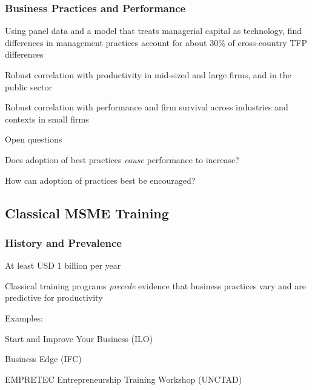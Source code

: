 \documentclass[hideothersubsections, usenames,dvipsnames,11pt]{beamer}
\newenvironment{itemize_2pt}{\itemize\addtolength{\itemsep}{2pt}}{\enditemize}
\begin{document}
\begin{frame}
\frametitle{Business Practices and Performance}

	Using panel data and a model that treats managerial capital as technology, \citet{Bloom2016} find differences in management practices account for about 30\% of cross-country TFP differences
	\begin{itemize_2pt}
		\item Robust correlation with productivity in \textcolor{bdf}{mid-sized and large firms}, and in the \textcolor{bdf}{public sector} \citep{Bloom2015,Bloom2020} %
		\item Robust correlation with performance and firm survival across industries and contexts in \textcolor{bdf}{small firms} \citep{McKenzie2017}
		\end{itemize_2pt}
		
\vspace{0.1in}	
	
	Open questions
	\begin{itemize_2pt}
		\item Does adoption of best practices \emph{cause} performance to increase?
		\item How can adoption of practices best be encouraged?
	\end{itemize_2pt}	
	
\end{frame}


\subsection{Classical MSME Training}

\begin{frame}
\frametitle{History and Prevalence}
	\begin{itemize_2pt}
		\item At least \textcolor{bdf}{USD 1 billion per year} \citep[for $\sim$ 4-5 million entrepreneurs;][]{McKenzie2021}
		\item Classical training programs \emph{precede} evidence that business practices vary and are predictive for productivity
		
		\vspace{0.5em}		
		
		\item Examples:
		\begin{itemize_2pt}
			\item Start and Improve Your Business (ILO)
			\item Business Edge (IFC)
			\item EMPRETEC Entrepreneurship Training Workshop (UNCTAD)
		\end{itemize_2pt} 
	\end{itemize_2pt}
\end{frame}
\end{document}
